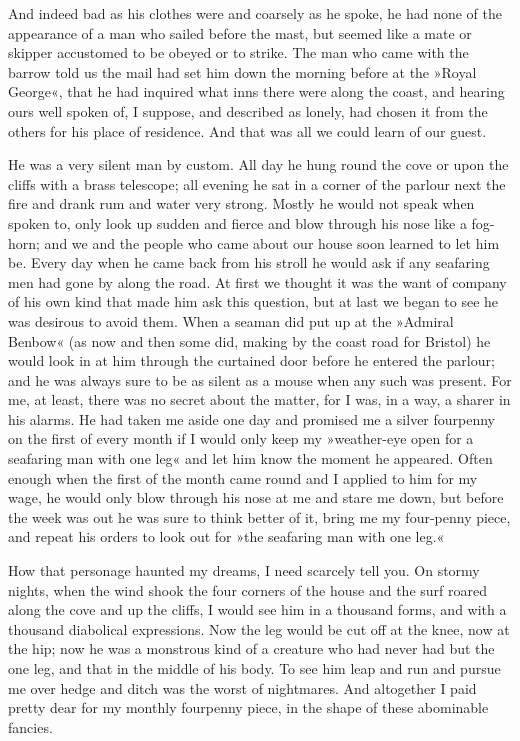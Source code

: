 And indeed bad as his clothes were and coarsely as he spoke, he had none of the appearance of a man who sailed before the mast, but seemed like a mate or skipper accustomed to be obeyed or to strike. The man who came with the barrow told us the mail had set him down the morning before at the »Royal George«, that he had inquired what inns there were along the coast, and hearing ours well spoken of, I suppose, and described as lonely, had chosen it from the others for his place of residence. And that was all we could learn of our guest.

He was a very silent man by custom. All day he hung round the cove or upon the cliffs with a brass telescope; all evening he sat in a corner of the parlour next the fire and drank rum and water very strong. Mostly he would not speak when spoken to, only look up sudden and fierce and blow through his nose like a fog-horn; and we and the people who came about our house soon learned to let him be. Every day when he came back from his stroll he would ask if any seafaring men had gone by along the road. At first we thought it was the want of company of his own kind that made him ask this question, but at last we began to see he was desirous to avoid them. When a seaman did put up at the »Admiral Benbow« (as now and then some did, making by the coast road for Bristol) he would look in at him through the curtained door before he entered the parlour; and he was always sure to be as silent as a mouse when any such was present. For me, at least, there was no secret about the matter, for I was, in a way, a sharer in his alarms. He had taken me aside one day and promised me a silver fourpenny on the first of every month if I would only keep my »weather-eye open for a seafaring man with one leg« and let him know the moment he appeared. Often enough when the first of the month came round and I applied to him for my wage, he would only blow through his nose at me and stare me down, but before the week was out he was sure to think better of it, bring me my four-penny piece, and repeat his orders to look out for »the seafaring man with one leg.«

How that personage haunted my dreams, I need scarcely tell you. On stormy nights, when the wind shook the four corners of the house and the surf roared along the cove and up the cliffs, I would see him in a thousand forms, and with a thousand diabolical expressions. Now the leg would be cut off at the knee, now at the hip; now he was a monstrous kind of a creature who had never had but the one leg, and that in the middle of his body. To see him leap and run and pursue me over hedge and ditch was the worst of nightmares. And altogether I paid pretty dear for my monthly fourpenny piece, in the shape of these abominable fancies.

